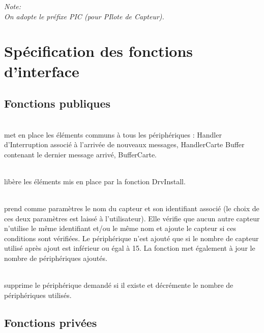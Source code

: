 
\textsl{
Note:\\
On adopte le préfixe PIC (pour PIlote de Capteur).
}

\section{Spécification des fonctions d'interface}

\subsection{Fonctions publiques}

\begin{m_desc}

 \item [PIC\_DrvInstall] \hfill\\
 met en place les éléments communs à tous les périphériques :
Handler d'Interruption associé à l'arrivée de nouveaux messages, HandlerCarte
Buffer contenant le dernier message arrivé, BufferCarte.
 \item [PIC\_DrvRemove] \hfill\\
libère les éléments mis en place par la fonction DrvInstall.

 \item [PIC\_DevAdd] \hfill\\
 prend comme paramètres le nom du capteur et son identifiant associé (le choix de ces deux paramètres est laissé à l'utilisateur). Elle vérifie que aucun autre capteur n'utilise le même identifiant et/ou le même nom et ajoute le capteur si ces conditions sont vérifiées.
Le périphérique n'est ajouté que si le nombre de capteur utilisé après ajout est inférieur ou égal à 15. La fonction met également à jour le nombre de périphériques ajoutés.
\vskip 4mm

 \item [PIC\_DevDelete] \hfill\\
supprime le périphérique demandé si il existe et décrémente le nombre de périphériques utilisés.

\end{m_desc}

\subsection{Fonctions privées}


